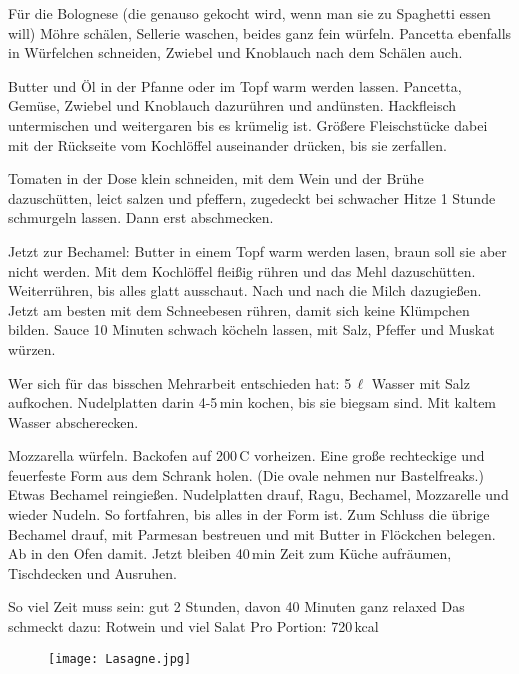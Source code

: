 \begin{Notes}
  \item F\"{u}r die Bolognese (die genauso gekocht wird, wenn man sie zu
    Spaghetti essen will) M\"{o}hre sch\"{a}len, Sellerie waschen, beides ganz
    fein w\"{u}rfeln. Pancetta ebenfalls in W\"{u}rfelchen schneiden, Zwiebel
    und Knoblauch nach dem Sch\"{a}len auch.

  \item Butter und \"{O}l in der Pfanne oder im Topf warm werden lassen.
    Pancetta, Gem\"{u}se, Zwiebel und Knoblauch dazur\"{u}hren und
    and\"{u}nsten. Hackfleisch untermischen und weitergaren bis es kr\"{u}melig
    ist. Gr\"{o}{\ss}ere Fleischst\"{u}cke dabei mit der R\"{u}ckseite vom
    Kochl\"{o}ffel auseinander dr\"{u}cken, bis sie zerfallen.
    
  \item Tomaten in der Dose klein schneiden, mit dem Wein und der Br\"{u}he
    dazusch\"{u}tten, leict salzen und pfeffern, zugedeckt bei schwacher Hitze 1
    Stunde schmurgeln lassen. Dann erst abschmecken.

  \item Jetzt zur Bechamel: Butter in einem Topf warm werden lasen, braun soll
    sie aber nicht werden. Mit dem Kochl\"{o}ffel flei{\ss}ig r\"{u}hren und das
    Mehl dazusch\"{u}tten. Weiterr\"{u}hren, bis alles glatt ausschaut. Nach und
    nach die Milch dazugie{\ss}en. Jetzt am besten mit dem Schneebesen
    r\"{u}hren, damit sich keine Kl\"{u}mpchen bilden. Sauce 10 Minuten schwach
    k\"{o}cheln lassen, mit Salz, Pfeffer und Muskat w\"{u}rzen.
    
  \item Wer sich f\"{u}r das bisschen Mehrarbeit entschieden hat: 5\,$\ell$
    Wasser mit Salz aufkochen. Nudelplatten darin 4-5\,min kochen, bis sie
    biegsam sind. Mit kaltem Wasser abscherecken.

  \item Mozzarella w\"{u}rfeln. Backofen auf 200\textdegree\,C vorheizen. Eine
    gro{\ss}e rechteckige und feuerfeste Form aus dem Schrank holen. (Die ovale
    nehmen nur Bastelfreaks.) Etwas Bechamel reingie{\ss}en. Nudelplatten drauf,
    Ragu, Bechamel, Mozzarelle und wieder Nudeln. So fortfahren, bis alles in
    der Form ist. Zum Schluss die \"{u}brige Bechamel drauf, mit Parmesan
    bestreuen und mit Butter in Fl\"{o}ckchen belegen. Ab in den Ofen damit.
    Jetzt bleiben 40\,min Zeit zum K\"{u}che aufr\"{a}umen, Tischdecken und
    Ausruhen.

\end{Notes}
So viel Zeit muss sein: gut 2 Stunden, davon 40 Minuten ganz relaxed \newline
Das schmeckt dazu: Rotwein und viel Salat
Pro Portion: 720\,kcal
\vfill
\begin{figure}[H]
  \centering
  \texttt{[image: Lasagne.jpg]}
\end{figure}
\newpage
